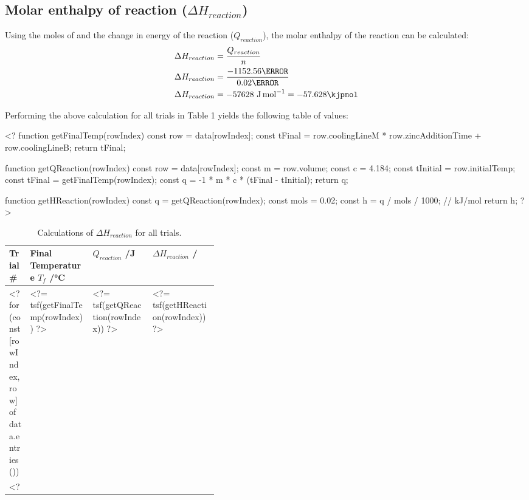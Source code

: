 \documentclass[12pt, notitlepage, letterpaper]{report}
\begin{document}
\subsection*{Molar enthalpy of reaction ($\Delta H_{reaction}$)}

Using the moles of  and the change in energy of the reaction ($Q_{reaction}$), the molar enthalpy of the reaction can be calculated:
%
\begin{align*}
	\Delta H_{reaction} & = \frac{Q_{reaction}}{n}                        \\
	\Delta H_{reaction} & = \frac{-1152.56\joule}{0.02\mol}               \\
	\Delta H_{reaction} & = -57628~\unit{\joule\per\mol} = -57.628\kjpmol
\end{align*}

Performing the above calculation for all trials in Table 1 yields the following table of values:

<?
function getFinalTemp(rowIndex) {
	const row = data[rowIndex];
	const tFinal = row.coolingLineM * row.zincAdditionTime + row.coolingLineB;
	return tFinal;
}

function getQReaction(rowIndex) {
	const row = data[rowIndex];
	const m = row.volume;
	const c = 4.184;
	const tInitial = row.initialTemp;
	const tFinal = getFinalTemp(rowIndex);
	const q = -1 * m * c * (tFinal - tInitial);
	return q;
}

function getHReaction(rowIndex) {
	const q = getQReaction(rowIndex);
	const mols = 0.02;
	const h = q / mols / 1000; // kJ/mol
	return h;
}
?>

\begin{table}[H]
	\caption{Calculations of $\Delta H_{reaction}$ for all trials.}
	\def\arraystretch{1.5}
	\begin{tabularx}{\linewidth}{|
			p{0.1\linewidth}|
			p{0.3\linewidth}|
			>{\RaggedRight}X|
			>{\RaggedRight}X|
		}
		\hline
		Trial \#
		 & Final Temperature $T_f$ /\unit{\celsius}
		 & $Q_{reaction}$ /\unit{\joule}
		 & $\Delta H_{reaction}$ /\unit{\kjpmol}
		\\\hline
		<? for (const [rowIndex, row] of data.entries()) { ?>
			<?= rowIndex + 1 ?>
			& <?= tsf(getFinalTemp(rowIndex)) ?>
			& <?= tsf(getQReaction(rowIndex)) ?>
			& <?= tsf(getHReaction(rowIndex)) ?>
			\\\hline
		<? } ?>
\end{tabularx}
\end{table}
\end{document}
